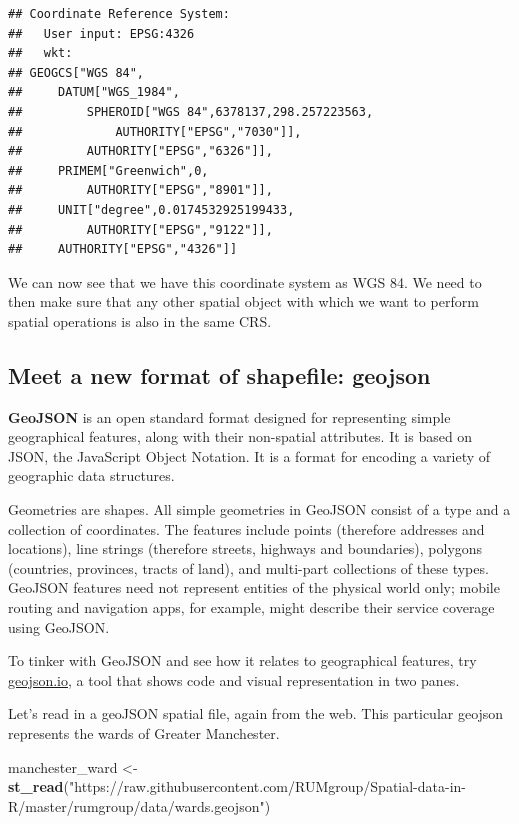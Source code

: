 \documentclass[]{book}
\newenvironment{Shaded}{\begin{snugshade}}{\end{snugshade}}
\newcommand{\KeywordTok}[1]{\textcolor[rgb]{0.13,0.29,0.53}{\textbf{#1}}}
\newcommand{\NormalTok}[1]{#1}
\newcommand{\StringTok}[1]{\textcolor[rgb]{0.31,0.60,0.02}{#1}}
\begin{document}
\begin{verbatim}
## Coordinate Reference System:
##   User input: EPSG:4326 
##   wkt:
## GEOGCS["WGS 84",
##     DATUM["WGS_1984",
##         SPHEROID["WGS 84",6378137,298.257223563,
##             AUTHORITY["EPSG","7030"]],
##         AUTHORITY["EPSG","6326"]],
##     PRIMEM["Greenwich",0,
##         AUTHORITY["EPSG","8901"]],
##     UNIT["degree",0.0174532925199433,
##         AUTHORITY["EPSG","9122"]],
##     AUTHORITY["EPSG","4326"]]
\end{verbatim}

We can now see that we have this coordinate system as WGS 84. We need to then make sure that any other spatial object with which we want to perform spatial operations is also in the same CRS.

\hypertarget{meet-a-new-format-of-shapefile-geojson}{%
\subsection{Meet a new format of shapefile: geojson}\label{meet-a-new-format-of-shapefile-geojson}}

\textbf{GeoJSON} is an open standard format designed for representing simple geographical features, along with their non-spatial attributes. It is based on JSON, the JavaScript Object Notation. It is a format for encoding a variety of geographic data structures.

Geometries are shapes. All simple geometries in GeoJSON consist of a type and a collection of coordinates. The features include points (therefore addresses and locations), line strings (therefore streets, highways and boundaries), polygons (countries, provinces, tracts of land), and multi-part collections of these types. GeoJSON features need not represent entities of the physical world only; mobile routing and navigation apps, for example, might describe their service coverage using GeoJSON.

To tinker with GeoJSON and see how it relates to geographical features, try \url{geojson.io}, a tool that shows code and visual representation in two panes.

Let's read in a geoJSON spatial file, again from the web. This particular geojson represents the wards of Greater Manchester.

\begin{Shaded}
\begin{Highlighting}[]
\NormalTok{manchester_ward <-}\StringTok{ }\KeywordTok{st_read}\NormalTok{(}\StringTok{"https://raw.githubusercontent.com/RUMgroup/Spatial-data-in-R/master/rumgroup/data/wards.geojson"}\NormalTok{)}
\end{Highlighting}
\end{Shaded}
\end{document}
